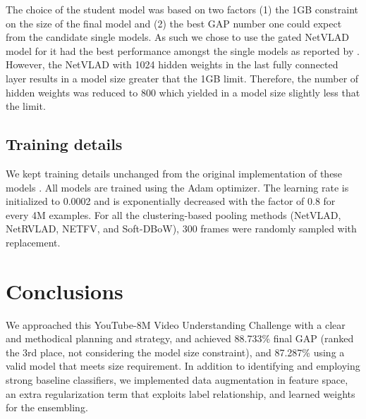 \documentclass[runningheads]{llncs}
\begin{document}
The choice of the student model was based on two factors (1) the 1GB constraint on the size of the final model and (2) the best GAP number one could expect from the candidate single models.
As such we chose to use the gated NetVLAD model for it had the best performance amongst the single models as reported by \cite{miech2017}.
However, the NetVLAD with 1024 hidden weights in the last fully connected layer results in a model size greater that the 1GB limit.
Therefore, the number of hidden weights was reduced to 800 which yielded in a model size slightly less that the limit.

\subsection{Training details}
We kept training details unchanged from the original implementation of these models \cite{miech2017}.
All models are trained using the Adam optimizer.
The learning rate is initialized to 0.0002 and is exponentially decreased with the factor of 0.8 for every 4M examples.
For all the clustering-based pooling methods (NetVLAD, NetRVLAD, NETFV, and Soft-DBoW), 300 frames were randomly sampled with replacement.


\section{Conclusions}
We approached this YouTube-8M Video Understanding Challenge with a clear and methodical planning and strategy, and achieved 88.733\% final GAP (ranked the 3rd place, not considering the model size constraint), and 87.287\% using a valid model that meets size requirement.
In addition to identifying and employing strong baseline classifiers, we implemented data augmentation in feature space, an extra regularization term that exploits label relationship, and learned weights for the ensembling.

\end{document}
